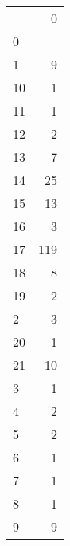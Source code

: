 \begin{tabular}{lr}
\toprule
  &    0 \\
0 &      \\
\midrule
1 &    9 \\
10 &    1 \\
11 &    1 \\
12 &    2 \\
13 &    7 \\
14 &   25 \\
15 &   13 \\
16 &    3 \\
17 &  119 \\
18 &    8 \\
19 &    2 \\
2 &    3 \\
20 &    1 \\
21 &   10 \\
3 &    1 \\
4 &    2 \\
5 &    2 \\
6 &    1 \\
7 &    1 \\
8 &    1 \\
9 &    9 \\
\bottomrule
\end{tabular}
